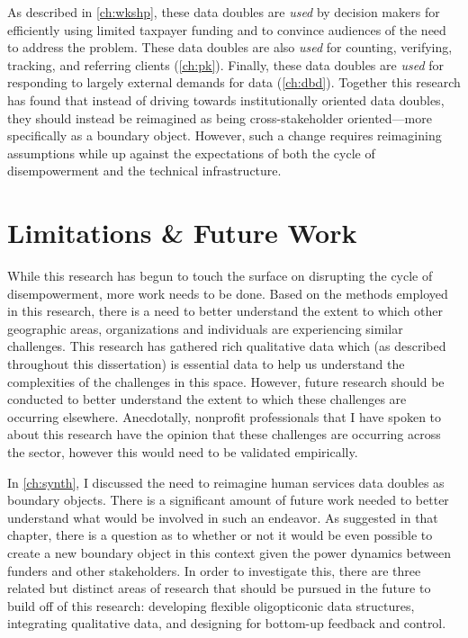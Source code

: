 As described in \autoref{ch:wkshp}, these data doubles are \emph{used} by decision makers for efficiently using limited taxpayer funding and to convince audiences of the need to address the problem. These data doubles are also \emph{used} for counting, verifying, tracking, and referring clients (\autoref{ch:pk}). Finally, these data doubles are \emph{used} for responding to largely external demands for data (\autoref{ch:dbd}). Together this research has found that instead of driving towards institutionally oriented data doubles, they should instead be reimagined as being cross-stakeholder oriented---more specifically as a boundary object. However, such a change requires reimagining assumptions while up against the expectations of both the cycle of disempowerment and the technical infrastructure.

\section{Limitations \& Future Work}
While this research has begun to touch the surface on disrupting the cycle of disempowerment, more work needs to be done. Based on the methods employed in this research, there is a need to better understand the extent to which other geographic areas, organizations and individuals are experiencing similar challenges. This research has gathered rich qualitative data which (as described throughout this dissertation) is essential data to help us understand the complexities of the challenges in this space. However, future research should be conducted to better understand the extent to which these challenges are occurring elsewhere. Anecdotally, nonprofit professionals that I have spoken to about this research have the opinion that these challenges are occurring across the sector, however this would need to be validated empirically.

In \autoref{ch:synth}, I discussed the need to reimagine human services data doubles as boundary objects. There is a significant amount of future work needed to better understand what would be involved in such an endeavor. As suggested in that chapter, there is a question as to whether or not it would be even possible to create a new boundary object in this context given the power dynamics between funders and other stakeholders. In order to investigate this, there are three related but distinct areas of research that should be pursued in the future to build off of this research: developing flexible oligopticonic data structures, integrating qualitative data, and designing for bottom-up feedback and control.

